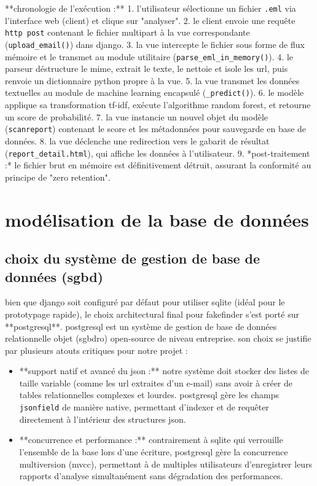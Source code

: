 \documentclass[12pt,a4paper]{report}
\begin{document}
**chronologie de l'exécution :**
1. l'utilisateur sélectionne un fichier \texttt{.eml} via l'interface web (client) et clique sur "analyser".
2. le client envoie une requête \texttt{http post} contenant le fichier multipart à la vue correspondante (\texttt{upload\_email()}) dans django.
3. la vue intercepte le fichier sous forme de flux mémoire et le transmet au module utilitaire (\texttt{parse\_eml\_in\_memory()}).
4. le parseur déstructure le mime, extrait le texte, le nettoie et isole les url, puis renvoie un dictionnaire python propre à la vue.
5. la vue transmet les données textuelles au module de machine learning encapsulé (\texttt{\_predict()}).
6. le modèle applique sa transformation tf-idf, exécute l'algorithme random forest, et retourne un score de probabilité.
7. la vue instancie un nouvel objet du modèle (\texttt{scanreport}) contenant le score et les métadonnées pour sauvegarde en base de données.
8. la vue déclenche une redirection vers le gabarit de résultat (\texttt{report\_detail.html}), qui affiche les données à l'utilisateur.
9. *post-traitement :* le fichier brut en mémoire est définitivement détruit, assurant la conformité au principe de "zero retention".

\section{modélisation de la base de données}

\subsection{choix du système de gestion de base de données (sgbd)}
bien que django soit configuré par défaut pour utiliser sqlite (idéal pour le prototypage rapide), le choix architectural final pour fakefinder s'est porté sur **postgresql**.
postgresql est un système de gestion de base de données relationnelle objet (sgbdro) open-source de niveau entreprise. son choix se justifie par plusieurs atouts critiques pour notre projet :
\begin{itemize}
    \item **support natif et avancé du json :** notre système doit stocker des listes de taille variable (comme les url extraites d'un e-mail) sans avoir à créer de tables relationnelles complexes et lourdes. postgresql gère les champs \texttt{jsonfield} de manière native, permettant d'indexer et de requêter directement à l'intérieur des structures json.
    \item **concurrence et performance :** contrairement à sqlite qui verrouille l'ensemble de la base lors d'une écriture, postgresql gère la concurrence multiversion (mvcc), permettant à de multiples utilisateurs d'enregistrer leurs rapports d'analyse simultanément sans dégradation des performances.
\end{itemize}
\end{document}
